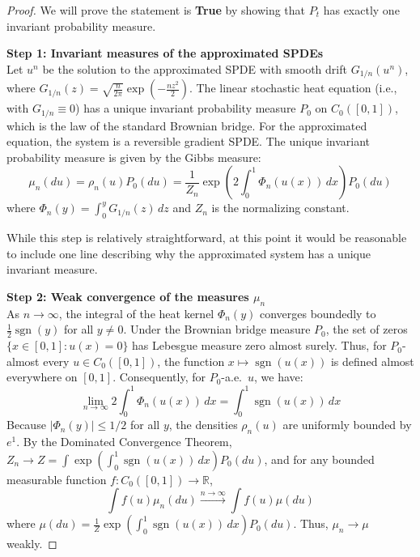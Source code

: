\documentclass[12pt]{article}
\newcommand{\review}[1]{\begin{reviewbox}#1\end{reviewbox}}
\begin{document}
\begin{proof}
We will prove the statement is \textbf{True} by showing that $P_t$ has exactly one invariant probability measure.

\medskip\noindent
\textbf{Step 1: Invariant measures of the approximated SPDEs}\\
Let $u^n$ be the solution to the approximated SPDE with smooth drift $G_{1/n}(u^n)$, where $G_{1/n}(z) = \sqrt{\frac{n}{2\pi}} \exp\left(-\frac{n z^2}{2}\right)$. 
The linear stochastic heat equation (i.e., with $G_{1/n} \equiv 0$) has a unique invariant probability measure $P_0$ on $C_0([0,1])$, which is the law of the standard Brownian bridge. 
For the approximated equation, the system is a reversible gradient SPDE. The unique invariant probability measure is given by the Gibbs measure:
\[ \mu_n(du) = \rho_n(u) P_0(du) = \frac{1}{Z_n} \exp\left(2 \int_0^1 \Phi_n(u(x)) \, dx\right) P_0(du) \]
where $\Phi_n(y) = \int_0^y G_{1/n}(z) \, dz$ and $Z_n$ is the normalizing constant. \review{While this step is relatively straightforward, at this point it would be reasonable to include one line describing why the approximated system has a unique invariant measure. }

\medskip\noindent
\textbf{Step 2: Weak convergence of the measures $\mu_n$}\\
As $n \to \infty$, the integral of the heat kernel $\Phi_n(y)$ converges boundedly to $\frac{1}{2}\operatorname{sgn}(y)$ for all $y \neq 0$. 
Under the Brownian bridge measure $P_0$, the set of zeros $\{x \in [0,1] : u(x) = 0\}$ has Lebesgue measure zero almost surely. Thus, for $P_0$-almost every $u \in C_0([0,1])$, the function $x \mapsto \operatorname{sgn}(u(x))$ is defined almost everywhere on $[0,1]$.
Consequently, for $P_0$-a.e.\ $u$, we have:
\[ \lim_{n\to\infty} 2\int_0^1 \Phi_n(u(x)) \, dx = \int_0^1 \operatorname{sgn}(u(x)) \, dx \]
Because $|\Phi_n(y)| \le 1/2$ for all $y$, the densities $\rho_n(u)$ are uniformly bounded by $e^1$. By the Dominated Convergence Theorem, $Z_n \to Z = \int \exp\left(\int_0^1 \operatorname{sgn}(u(x)) \, dx\right) P_0(du)$, and for any bounded measurable function $f\colon C_0([0,1]) \to \mathbb{R}$,
\[ \int f(u) \mu_n(du) \xrightarrow{n \to \infty} \int f(u) \mu(du) \]
where $\mu(du) = \frac{1}{Z} \exp\left( \int_0^1 \operatorname{sgn}(u(x)) \, dx \right) P_0(du)$. Thus, $\mu_n \to \mu$ weakly.


\end{proof}
\end{document}

